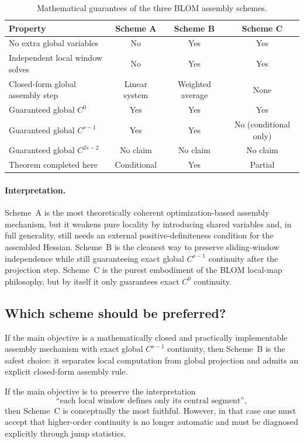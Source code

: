 \begin{table}[t]
\centering
\caption{Mathematical guarantees of the three BLOM assembly schemes.}
\label{tab:phase5_scheme_compare}
\begin{tabular}{lccc}
\hline
Property & Scheme A & Scheme B & Scheme C \\
\hline
No extra global variables & No & Yes & Yes \\
Independent local window solves & No & Yes & Yes \\
Closed-form global assembly step & Linear system & Weighted average & None \\
Guaranteed global \(C^0\) & Yes & Yes & Yes \\
Guaranteed global \(C^{s-1}\) & Yes & Yes & No (conditional only) \\
Guaranteed global \(C^{2s-2}\) & No claim & No claim & No claim \\
Theorem completed here & Conditional & Yes & Partial \\
\hline
\end{tabular}
\end{table}

\paragraph{Interpretation.}
Scheme~A is the most theoretically coherent optimization-based assembly mechanism, but it weakens pure locality by introducing shared variables and, in full generality, still needs an external positive-definiteness condition for the assembled Hessian.
Scheme~B is the cleanest way to preserve sliding-window independence while still guaranteeing exact global \(C^{s-1}\) continuity after the projection step.
Scheme~C is the purest embodiment of the BLOM local-map philosophy, but by itself it only guarantees exact \(C^0\) continuity.

\subsection{Which scheme should be preferred?}
\label{subsec:phase5_preference}

If the main objective is a mathematically closed and practically implementable assembly mechanism with exact global \(C^{s-1}\) continuity, then Scheme~B is the safest choice:
it separates local computation from global projection and admits an explicit closed-form assembly rule.

If the main objective is to preserve the interpretation
\[
\text{``each local window defines only its central segment''},
\]
then Scheme~C is conceptually the most faithful.
However, in that case one must accept that higher-order continuity is no longer automatic and must be diagnosed explicitly through jump statistics.

